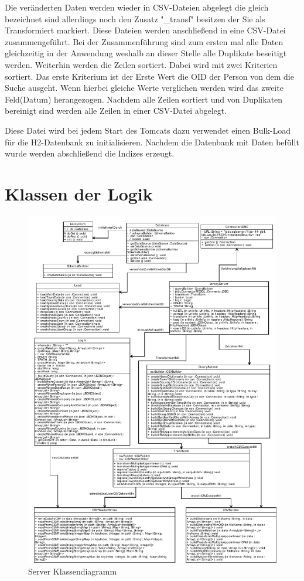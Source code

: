 Die veränderten Daten werden wieder in CSV-Dateien abgelegt die gleich bezeichnet sind allerdings noch den Zusatz "\_transf" besitzen der Sie als Transformiert  markiert. Diese Dateien werden anschließend in eine CSV-Datei zusammengeführt. Bei der Zusammenführung sind zum ersten mal alle Daten gleichzeitig in der Anwendung weshalb an dieser Stelle alle Duplikate beseitigt werden. Weiterhin werden die Zeilen sortiert. Dabei wird mit zwei Kriterien sortiert. Das erste Kriterium ist der Erste Wert die OID der Person von dem die Suche ausgeht. Wenn hierbei gleiche Werte verglichen werden wird das zweite Feld(Datum) herangezogen. Nachdem alle Zeilen sortiert und von Duplikaten bereinigt sind werden alle Zeilen in einer CSV-Datei abgelegt. 

Diese Datei wird bei jedem Start des Tomcats dazu verwendet einen Bulk-Load für die H2-Datenbank zu initialisieren. Nachdem die Datenbank mit Daten befüllt wurde werden abschließend die Indizes erzeugt.

\section{Klassen der Logik}

\begin{figure}[htbp]
\begin{center}
\includegraphics[width=1.0\textwidth]{pics/ServerKlassendiagramm.pdf}
\caption{Server Klassendiagramm}
\label{umsetzung_klassendiagramm_server}
\end{center}
\end{figure}

